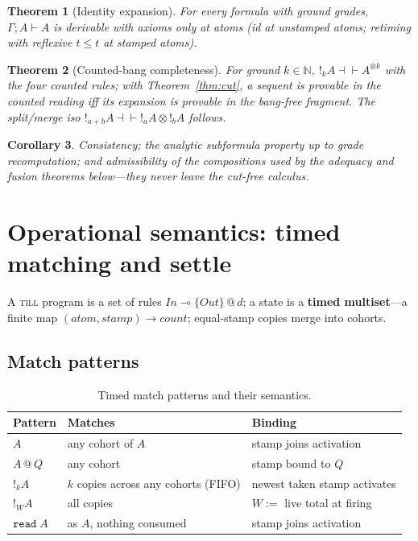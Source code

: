 \documentclass[11pt]{article}
\makeatletter
\newcommand{\lax}[2]{\{#1\}\mathbin{@}#2}       %
\newcommand{\gbang}[1]{{!}_{#1}}                 %
\newcommand{\loli}{\multimap}                    %
\newcommand{\tensor}{\otimes}                    %
\newcommand{\NN}{\mathbb{N}}                     %
\newcommand{\stmp}[2]{#1\mathbin{@}#2}           %
\newcommand{\till}{\textsc{till}}                %
\newtheorem{theorem}{Theorem}[section]
\newtheorem{corollary}[theorem]{Corollary}
\theoremstyle{definition}
\theoremstyle{remark}
\makeatother
\begin{document}
\begin{theorem}[Identity expansion]
\label{thm:id-expand}
For every formula with ground grades, $\Gamma; A \vdash A$ is derivable with
axioms only at atoms (id at unstamped atoms; retiming with reflexive $t \leq t$
at stamped atoms).
\end{theorem}

\begin{theorem}[Counted-bang completeness]
\label{thm:counted-bang}
For ground $k \in \NN$, $\gbang{k} A \dashv\vdash A^{\tensor k}$ with the four
counted rules; with Theorem~\ref{thm:cut}, a sequent is provable in the counted
reading iff its expansion is provable in the bang-free fragment.  The split/merge
iso $\gbang{a+b} A \dashv\vdash \gbang{a} A \tensor \gbang{b} A$ follows.
\end{theorem}

\begin{corollary}
\label{cor:misc}
Consistency; the analytic subformula property up to grade recomputation; and
admissibility of the compositions used by the adequacy and fusion theorems
below---they never leave the cut-free calculus.
\end{corollary}

\section{Operational semantics: timed matching and settle}
\label{sec:opsem}

A \till{} program is a set of rules $\mathit{In} \loli \lax{\mathit{Out}}{d}$; a
state is a \textbf{timed multiset}---a finite map $(\mathit{atom},
\mathit{stamp}) \to \mathit{count}$; equal-stamp copies merge into cohorts.

\subsection{Match patterns}

\begin{table}[ht]
\centering
\begin{tabular}{@{}lll@{}}
\toprule
Pattern          & Matches                               & Binding \\
\midrule
$A$              & any cohort of $A$                     & stamp joins activation \\
$\stmp{A}{Q}$    & any cohort                            & stamp bound to $Q$ \\
$\gbang{k} A$   & $k$ copies across any cohorts (FIFO)  & newest taken stamp activates \\
$\gbang{W} A$   & all copies                            & $W :=$ live total at firing \\
$\mathtt{read}\;A$ & as $A$, nothing consumed            & stamp joins activation \\
\bottomrule
\end{tabular}
\caption{Timed match patterns and their semantics.}
\label{tab:patterns}
\end{table}
\end{document}
